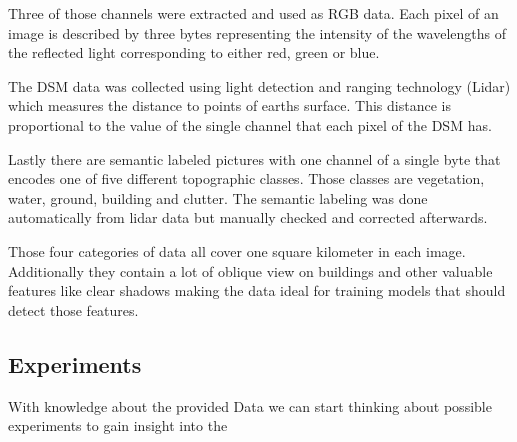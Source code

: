 Three of those channels were extracted and used as RGB data. 
Each pixel of an image is described by three bytes representing the intensity of the wavelengths of the 
reflected light corresponding to either red, green or blue.

The DSM data was collected using light detection and ranging technology (Lidar) which measures the 
distance to points of earths surface. This distance is proportional to the value of the single channel
that each pixel of the DSM has.

Lastly there are semantic labeled pictures with one channel of a single byte that encodes one of five 
different topographic classes. Those classes are vegetation, water, ground, building and clutter. 
The semantic labeling was done automatically from lidar data but manually checked and corrected afterwards.

Those four categories of data all cover one square kilometer in each image.
Additionally they contain a lot of oblique view on buildings and other valuable
features like clear shadows making the data ideal for training models that should 
detect those features.

\subsection{Experiments}

With knowledge about the provided Data we can start thinking about possible experiments to
gain insight into the 